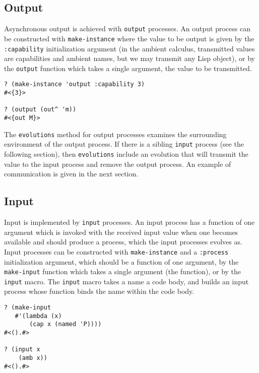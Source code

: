 \documentclass[12pt]{article}
\begin{document}
\subsection{Output}
\label{sec:output}

Asynchronous output is achieved with \texttt{output} processes.
An output process can be constructed with \texttt{make-instance} where the value to be output is given by the \texttt{:capability} initialization argument (in the ambient calculus, transmitted values are capabilities and ambient names, but we may transmit any Lisp object), or by the \texttt{output} function which takes a single argument, the value to be transmitted.

\begin{verbatim}
? (make-instance 'output :capability 3)
#<{3}>

? (output (out^ 'm))
#<{out M}>

\end{verbatim}

The \texttt{evolutions} method for output processes examines the surrounding environment of the output process.
If there is a sibling \texttt{input} process (see the following section), then \texttt{evolutions} include an evolution that will transmit the value to the input process and remove the output process.
An example of communication is given in the next section.

\subsection{Input}
\label{sec:input}

Input is implemented by \texttt{input} processes.
An input process has a function of one argument which is invoked with the received input value when one becomes available and should produce a process, which the input processes evolves as.
Input processes can be constructed with \texttt{make-instance} and a \texttt{:process} initialization argument, which should be a function of one argument, by the \texttt{make-input} function which takes a single argument (the function), or by the \texttt{input} macro.
The \texttt{input} macro takes a name a code body, and builds an input process whose function binds the name within the code body.

\begin{verbatim}
? (make-input
   #'(lambda (x)
       (cap x (named 'P))))
#<().#>

? (input x
    (amb x))
#<().#>
\end{verbatim}
\end{document}
